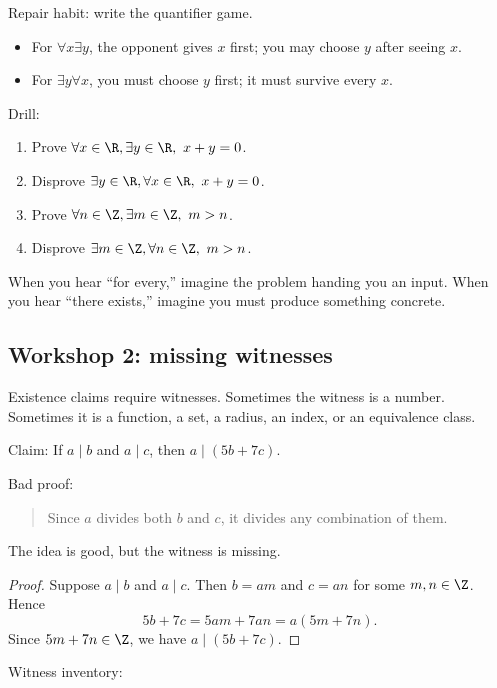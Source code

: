 Repair habit: write the quantifier game.

\begin{itemize}
\item For $\forall x\exists y$, the opponent gives $x$ first; you may choose $y$ after seeing $x$.
\item For $\exists y\forall x$, you must choose $y$ first; it must survive every $x$.
\end{itemize}

Drill:

\begin{enumerate}
\item Prove $\forall x\in\R,\exists y\in\R,\ x+y=0$.
\item Disprove $\exists y\in\R,\forall x\in\R,\ x+y=0$.
\item Prove $\forall n\in\Z,\exists m\in\Z,\ m>n$.
\item Disprove $\exists m\in\Z,\forall n\in\Z,\ m>n$.
\end{enumerate}

\begin{walkbox}
When you hear ``for every,'' imagine the problem handing you an input. When you hear ``there exists,'' imagine you must produce something concrete.
\end{walkbox}

\subsection{Workshop 2: missing witnesses}

Existence claims require witnesses. Sometimes the witness is a number. Sometimes it is a function, a set, a radius, an index, or an equivalence class.

Claim: If $a\mid b$ and $a\mid c$, then $a\mid(5b+7c)$.

Bad proof:

\begin{quote}
Since $a$ divides both $b$ and $c$, it divides any combination of them.
\end{quote}

The idea is good, but the witness is missing.

\begin{proof}
Suppose $a\mid b$ and $a\mid c$. Then $b=am$ and $c=an$ for some $m,n\in\Z$. Hence
\[
5b+7c=5am+7an=a(5m+7n).
\]
Since $5m+7n\in\Z$, we have $a\mid(5b+7c)$.
\end{proof}

Witness inventory:

